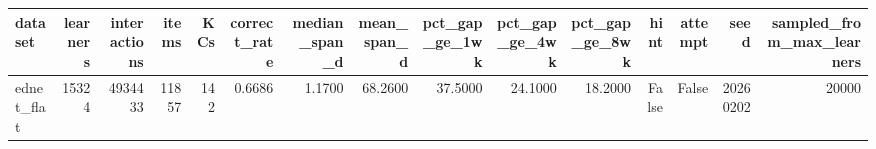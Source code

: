 \begin{tabular}{lrrrrrrrrrrrrrr}
\toprule
dataset & learners & interactions & items & KCs & correct\_rate & median\_span\_d & mean\_span\_d & pct\_gap\_ge\_1wk & pct\_gap\_ge\_4wk & pct\_gap\_ge\_8wk & hint & attempt & seed & sampled\_from\_max\_learners \\
\midrule
ednet\_flat & 15324 & 4934433 & 11857 & 142 & 0.6686 & 1.1700 & 68.2600 & 37.5000 & 24.1000 & 18.2000 & False & False & 20260202 & 20000 \\
\bottomrule
\end{tabular}
